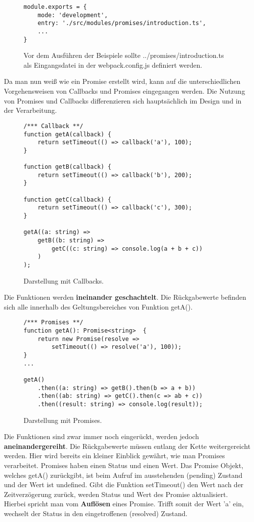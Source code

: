 \begin{figure}[H]
\begin{lstlisting}[basicstyle=\small]
module.exports = {
    mode: 'development',
    entry: './src/modules/promises/introduction.ts',
    ...
}
\end{lstlisting}
\caption{Vor dem Ausführen der Beispiele sollte ../promises/introduction.ts als Eingangsdatei in der webpack.config.js definiert werden.}
\end{figure}

\noindent
Da man nun weiß wie ein Promise erstellt wird, kann auf die unterschiedlichen Vorgehensweisen von Callbacks und Promises eingegangen werden. Die Nutzung von Promises und Callbacks differenzieren sich hauptsächlich im Design und in der Verarbeitung.

\begin{figure}[H]
\begin{lstlisting}[basicstyle=\small]
/*** Callback **/
function getA(callback) {
    return setTimeout(() => callback('a'), 100);
}

function getB(callback) {
    return setTimeout(() => callback('b'), 200);
}

function getC(callback) {
    return setTimeout(() => callback('c'), 300);
}

getA((a: string) =>
    getB((b: string) =>
        getC((c: string) => console.log(a + b + c))
    )
);
\end{lstlisting}
\caption{Darstellung mit Callbacks.}
\end{figure}

\noindent
Die Funktionen werden \textbf{ineinander geschachtelt}. Die Rückgabewerte befinden sich alle innerhalb des Geltungsbereiches von Funktion getA().

\begin{figure}[H]
\begin{lstlisting}[basicstyle=\small]
/*** Promises **/
function getA(): Promise<string>  {
    return new Promise(resolve =>
        setTimeout(() => resolve('a'), 100));
}
...

getA()
    .then((a: string) => getB().then(b => a + b))
    .then((ab: string) => getC().then(c => ab + c))
    .then((result: string) => console.log(result));
\end{lstlisting}
\caption{Darstellung mit Promises.}
\end{figure}

\noindent
Die Funktionen sind zwar immer noch eingerückt, werden jedoch \textbf{aneinandergereiht}. Die Rückgabewerte müssen entlang der Kette weitergereicht werden. Hier wird bereits ein kleiner Einblick gewährt, wie man Promises verarbeitet. Promises haben einen Status und einen Wert. Das Promise Objekt, welches getA() zurückgibt, ist beim Aufruf im ausstehenden (pending) Zustand und der Wert ist undefined. Gibt die Funktion setTimeout() den Wert nach der Zeitverzögerung zurück, werden Status und Wert des Promise aktualisiert. Hierbei spricht man vom \textbf{Auflösen} eines Promise. Trifft somit der Wert 'a' ein, wechselt der Status in den eingetroffenen (resolved) Zustand.

